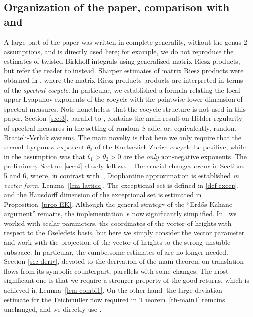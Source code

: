 \documentclass[10pt]{amsart}
\theoremstyle{plain}
\theoremstyle{definition}
\begin{document}
\subsection{Organization of the paper, comparison with \cite{BuSo18a} and \cite{BuSo19}} A large part of the paper \cite{BuSo18a} was written in complete generality, without the genus 2 assumptions, and is directly used here; for
example, we do not reproduce the estimates of twisted Birkhoff integrals using generalized matrix Riesz products, but refer the reader to \cite[\S3]{BuSo18a} instead.
Sharper estimates of matrix Riesz products were obtained in \cite{BuSo19}, where the matrix Riesz products products are interpreted in terms of the \emph{spectral cocycle}. In particular, we established a formula relating the local upper Lyapunov exponents of the cocycle with the pointwise lower dimension of spectral measures. Note nonetheless that the cocycle structure is not used in this paper.
Section \ref{sec:3}, parallel to \cite[\S4]{BuSo18a}, contains the main result on Hölder regularity of spectral measures in the setting of random $S$-adic, or, equivalently, random Bratteli-Verhik systems.
The main novelty is that here we only require that the second Lyapunov exponent $\theta_2$ of the
Kontsevich-Zorich cocycle be positive, while in \cite{BuSo18a} the assumption was that $\theta_1 > \theta_2 >0$ are the \emph{only} non-negative exponents.
The preliminary Section \ref{sec:4} closely follows \cite{BuSo18a}.
The crucial changes occur in Sections 5 and 6, where, in contrast with~\cite{BuSo18a}, Diophantine approximation is established {\it in vector form}, \cf Lemma~\ref{lem-lattice}. The exceptional set is defined in \eqref{def-excep}, and the Hausdorff dimension of the exceptional set is estimated in Proposition~\ref{prop-EK}. Although the general strategy of the ``Erd\H{o}s-Kahane argu\-ment'' remains, the implementation is now significantly simplified. In~\cite{BuSo18a} we worked with scalar parameters, the coordinates of the vector of heights with respect to the \hbox{Oseledets} \hbox{basis}, but here we simply consider the vector parameter and work with the projection of the vector of heights to the strong unstable subspace.
In particular, the cumbersome estimates of \cite[\S8]{BuSo18a} are no longer needed.
Section \ref{sec-deriv}, devoted to the derivation of the main theorem on translation flows from its symbolic counterpart, parallels \cite[\S11]{BuSo18a} with some changes. The most significant one is that we require a stronger property of the good returns, which is achieved in Lemma~\ref{lem-combi1}. On the other hand, the large deviation estimate for the Teichmüller flow required in Theorem~\ref{th-main1} remains unchanged, and we directly use \cite[Prop.\,11.3]{BuSo18a}.\enlargethispage{.5\baselineskip}%
\end{document}
